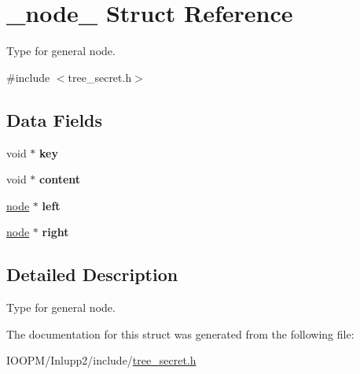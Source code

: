 \hypertarget{struct__node__}{}\section{\+\_\+node\+\_\+ Struct Reference}
\label{struct__node__}


Type for general node.  




{\ttfamily \#include $<$tree\+\_\+secret.\+h$>$}

\subsection*{Data Fields}
\begin{DoxyCompactItemize}
\item 
\hypertarget{struct__node___ab5c000aec752f2206131e183daf5efbf}{}void $\ast$ {\bfseries key}\label{struct__node___ab5c000aec752f2206131e183daf5efbf}

\item 
\hypertarget{struct__node___a3d6d14728fec84498eff595a3e31d15a}{}void $\ast$ {\bfseries content}\label{struct__node___a3d6d14728fec84498eff595a3e31d15a}

\item 
\hypertarget{struct__node___a1ef696d612a6d91ca233f86051a17560}{}\hyperlink{struct__node__}{node} $\ast$ {\bfseries left}\label{struct__node___a1ef696d612a6d91ca233f86051a17560}

\item 
\hypertarget{struct__node___a894eba354b6e329d3a4e5ef5bd51d494}{}\hyperlink{struct__node__}{node} $\ast$ {\bfseries right}\label{struct__node___a894eba354b6e329d3a4e5ef5bd51d494}

\end{DoxyCompactItemize}


\subsection{Detailed Description}
Type for general node. 

The documentation for this struct was generated from the following file\+:\begin{DoxyCompactItemize}
\item 
I\+O\+O\+P\+M/\+Inlupp2/include/\hyperlink{tree__secret_8h}{tree\+\_\+secret.\+h}\end{DoxyCompactItemize}
